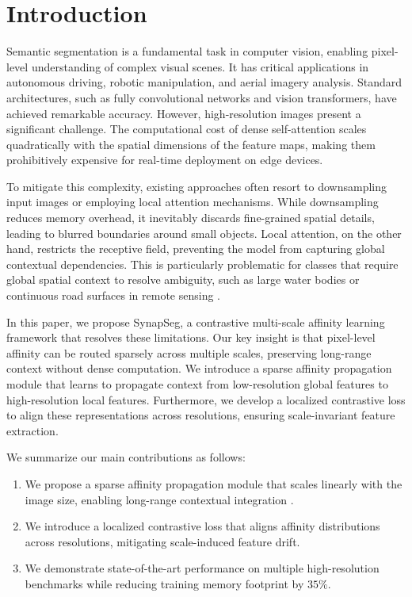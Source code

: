 \section{Introduction}
Semantic segmentation is a fundamental task in computer vision, enabling pixel-level understanding of complex visual scenes. It has critical applications in autonomous driving, robotic manipulation, and aerial imagery analysis. Standard architectures, such as fully convolutional networks and vision transformers, have achieved remarkable accuracy. However, high-resolution images present a significant challenge. The computational cost of dense self-attention scales quadratically with the spatial dimensions of the feature maps, making them prohibitively expensive for real-time deployment on edge devices.

To mitigate this complexity, existing approaches often resort to downsampling input images or employing local attention mechanisms. While downsampling reduces memory overhead, it inevitably discards fine-grained spatial details, leading to blurred boundaries around small objects. Local attention, on the other hand, restricts the receptive field, preventing the model from capturing global contextual dependencies. This is particularly problematic for classes that require global spatial context to resolve ambiguity, such as large water bodies or continuous road surfaces in remote sensing \cite{miller2023aerial}.

In this paper, we propose SynapSeg, a contrastive multi-scale affinity learning framework that resolves these limitations. Our key insight is that pixel-level affinity can be routed sparsely across multiple scales, preserving long-range context without dense computation. We introduce a sparse affinity propagation module that learns to propagate context from low-resolution global features to high-resolution local features. Furthermore, we develop a localized contrastive loss to align these representations across resolutions, ensuring scale-invariant feature extraction.

We summarize our main contributions as follows:
\begin{enumerate}[label={\lbrack\roman*\rbrack}, leftmargin=*]
  \item We propose a sparse affinity propagation module that scales linearly with the image size, enabling long-range contextual integration \cite{wong2022sparse}.
  \item We introduce a localized contrastive loss that aligns affinity distributions across resolutions, mitigating scale-induced feature drift.
  \item We demonstrate state-of-the-art performance on multiple high-resolution benchmarks while reducing training memory footprint by $35\%$.
\end{enumerate}
